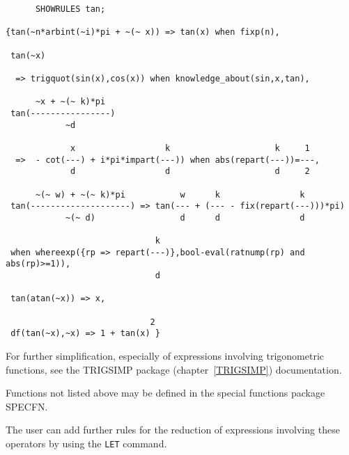\begin{verbatim}
      SHOWRULES tan;

{tan(~n*arbint(~i)*pi + ~(~ x)) => tan(x) when fixp(n),

 tan(~x)

  => trigquot(sin(x),cos(x)) when knowledge_about(sin,x,tan),

      ~x + ~(~ k)*pi
 tan(----------------)
            ~d

             x                  k                     k     1
  =>  - cot(---) + i*pi*impart(---)) when abs(repart(---))=---,
             d                  d                     d     2

      ~(~ w) + ~(~ k)*pi           w      k                k
 tan(--------------------) => tan(--- + (--- - fix(repart(---)))*pi)
            ~(~ d)                 d      d                d

                              k
 when whereexp({rp => repart(---)},bool-eval(ratnump(rp) and abs(rp)>=1)),
                              d

 tan(atan(~x)) => x,

                             2
 df(tan(~x),~x) => 1 + tan(x) }

\end{verbatim}

For further simplification, especially of expressions involving
trigonometric functions, see the TRIGSIMP package
(chapter~\ref{TRIGSIMP}) documentation.

Functions not listed above may be defined in the special functions
package SPECFN.

The user can add further rules for the reduction of expressions involving
these operators by using the \texttt{LET} command.



